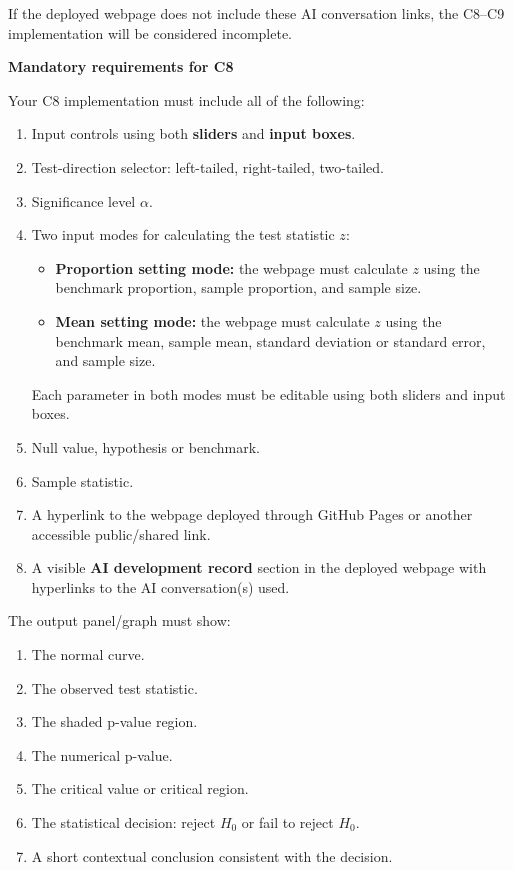 \documentclass[12pt]{article}
\newcommand{\SubsectionBox}[1]{%
	\noindent\colorbox{gray!30}{%
		\parbox{\linewidth}{\textbf{#1}}%
	}\par\vspace{0.35cm}%
}
\begin{document}
	If the deployed webpage does not include these AI conversation links, the C8--C9 implementation will be considered incomplete.
	
	\SubsectionBox{Mandatory requirements for C8}
	Your C8 implementation must include all of the following:
	\begin{enumerate}
		\item Input controls using both \textbf{sliders} and \textbf{input boxes}.
		\item Test-direction selector: left-tailed, right-tailed, two-tailed.
		\item Significance level \(\alpha\).
		\item Two input modes for calculating the test statistic \(z\):
		\begin{itemize}
			\item \textbf{Proportion setting mode:} the webpage must calculate \(z\) using the benchmark proportion, sample proportion, and sample size.
			\item \textbf{Mean setting mode:} the webpage must calculate \(z\) using the benchmark mean, sample mean, standard deviation or standard error, and sample size.
		\end{itemize}
		Each parameter in both modes must be editable using both sliders and input boxes.
		\item Null value, hypothesis or benchmark.
		\item Sample statistic.
		\item A hyperlink to the webpage deployed through GitHub Pages or another accessible public/shared link.
		\item A visible \textbf{AI development record} section in the deployed webpage with hyperlinks to the AI conversation(s) used.
	\end{enumerate}
	
	The output panel/graph must show:
	\begin{enumerate}
		\item The normal curve.
		\item The observed test statistic.
		\item The shaded p-value region.
		\item The numerical p-value.
		\item The critical value or critical region.
		\item The statistical decision: reject \(H_0\) or fail to reject \(H_0\).
		\item A short contextual conclusion consistent with the decision.
	\end{enumerate}
	
\end{document}
